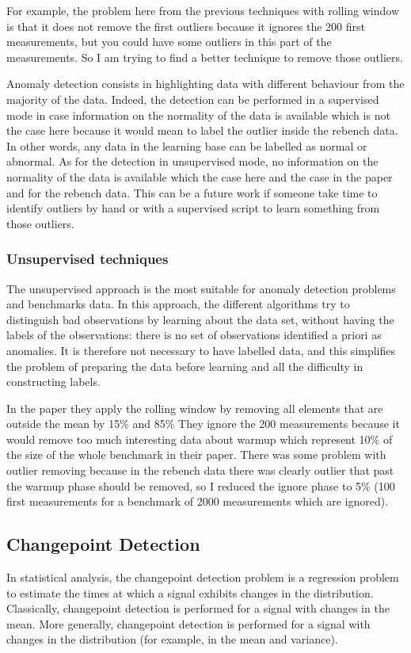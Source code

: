 \documentclass{article}
\begin{document}
For example, the problem here from the previous techniques with rolling window is that it does not remove the first outliers because it ignores the 200 first measurements, but you could have some outliers in this part of the measurements. So I am trying to find a better technique to remove those outliers.

Anomaly detection consists in highlighting data with different behaviour from the majority of the data. 
Indeed, the detection can be performed in a supervised mode in case information on the normality of the data is available which is not the case here because it would mean to label the outlier inside the rebench data. In other words, any data in the learning base can be labelled as normal or abnormal.
As for the detection in unsupervised mode, no information on the normality of the data is available which the case here and the case in the \citep{barrett2017virtual} paper and for the rebench data. This can be a future work if someone take time to identify outliers by hand or with a supervised script to learn something from those outliers.

\subsubsection{Unsupervised techniques}
The unsupervised approach is the most suitable for anomaly detection problems and benchmarks data. In this approach, the different algorithms try to distinguish bad observations by learning about the data set, without having the labels of the observations: there is no set of observations identified a priori as anomalies. It is therefore not necessary to have labelled data, and this simplifies the problem of preparing the data before learning and all the difficulty in constructing labels.

In the paper they apply the rolling window by removing all elements that are outside the mean by 15\% and 85\% They ignore the 200 measurements because it would remove too much interesting data about warmup which represent 10\% of the size of the whole benchmark in their paper. There was some problem with outlier removing because in the rebench data there was clearly outlier that past the warmup phase should be removed, so I reduced the ignore phase to 5\% (100 first measurements for a benchmark of 2000 measurements which are ignored).


\subsection{Changepoint Detection}
In statistical analysis,  the changepoint detection problem is a regression problem to estimate the times at which a signal exhibits changes in the distribution. Classically, changepoint detection is performed for a signal with changes in the mean. More generally, changepoint detection is performed for a signal with changes in the distribution (for example, in the mean and variance). \\
\end{document}
